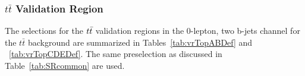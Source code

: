 %
%    
%    
%    


%
\subsubsection{\boldmath$t\bar{t}$ Validation Region}


The selections for the $t\bar{t}$ validation regions in the 0-lepton, two b-jets channel for the $t\bar{t}$ background are summarized in Tables~\ref{tab:vrTopABDef} and ~\ref{tab:vrTopCDEDef}. The same preselection as discussed in Table~\ref{tab:SRcommon} are used.

